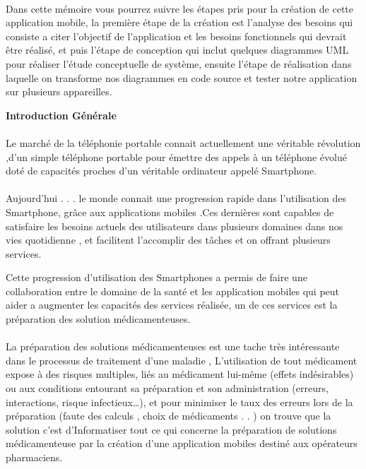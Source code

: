 \documentclass[12pt, openany]{report}
\begin{document}
\paragraph{}Dans cette mémoire vous pourrez suivre les étapes pris pour la création de cette application mobile, la première étape de la création est l'analyse des besoins qui consiste a citer l'objectif de l'application et les besoins fonctionnels qui devrait être réalisé, et puis l'étape de conception qui inclut quelques diagrammes UML pour réaliser l’étude conceptuelle de système, ensuite l’étape de réalisation dans laquelle on transforme nos diagrammes en code source et tester notre application sur plusieurs appareilles.

\tableofcontents
\vspace{110ex}

\listoffigures
{}
\newpage

\begin{center}
	\textsf{ \huge \textbf{Introduction Générale}}
\end{center}
\large \paragraph{} 
Le marché de la téléphonie portable connait actuellement une véritable révolution ,d'un simple téléphone portable pour émettre des appels à un téléphone évolué doté de capacités proches d'un véritable ordinateur appelé Smartphone.


\paragraph{}
Aujourd'hui  . . . le monde connait une progression rapide dans l’utilisation des Smartphone, grâce aux applications mobiles .Ces dernières sont capables de satisfaire les besoins actuels des utilisateurs dans plusieurs domaines dans nos vies quotidienne , et facilitent l'accomplir des tâches et on offrant plusieurs services. 

Cette progression d'utilisation des Smartphones a permis de faire une collaboration entre le domaine de la santé et les application mobiles qui peut aider a augmenter les capacités des services réalisée, un de ces services est la préparation des solution médicamenteuses.  
\paragraph{}
La préparation des solutions médicamenteuses est une tache très intéressante dans le processus de traitement d'une maladie , L’utilisation de tout médicament expose à des risques multiples, liés au médicament lui-même (effets indésirables) ou aux conditions entourant sa préparation et son administration (erreurs, interactions, risque infectieux…), et pour minimiser le taux des erreurs lors de la préparation (faute des calculs , choix de médicaments . . ) on trouve que la solution c'est d'Informatiser tout ce qui concerne la préparation de solutions médicamenteuse par la création d'une application mobiles destiné aux opérateurs pharmaciens.
\end{document}
